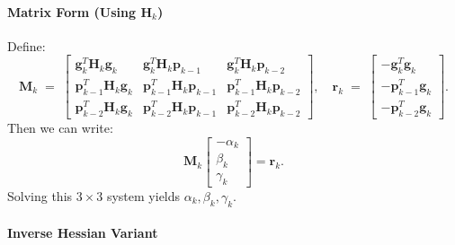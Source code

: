 \documentclass[12pt]{article}
\begin{document}
\paragraph{Matrix Form (Using \(\mathbf{H}_k\))}
Define:
\[
\mathbf{M}_k \;=\;
\begin{bmatrix}
\mathbf{g}_k^T \mathbf{H}_k \mathbf{g}_k & \mathbf{g}_k^T \mathbf{H}_k \mathbf{p}_{k-1} & \mathbf{g}_k^T \mathbf{H}_k \mathbf{p}_{k-2} \\[6pt]
\mathbf{p}_{k-1}^T \mathbf{H}_k \mathbf{g}_k & \mathbf{p}_{k-1}^T \mathbf{H}_k \mathbf{p}_{k-1} & \mathbf{p}_{k-1}^T \mathbf{H}_k \mathbf{p}_{k-2} \\[6pt]
\mathbf{p}_{k-2}^T \mathbf{H}_k \mathbf{g}_k & \mathbf{p}_{k-2}^T \mathbf{H}_k \mathbf{p}_{k-1} & \mathbf{p}_{k-2}^T \mathbf{H}_k \mathbf{p}_{k-2}
\end{bmatrix},
\quad
\mathbf{r}_k \;=\;
\begin{bmatrix}
-\mathbf{g}_k^T \mathbf{g}_k \\[3pt]
-\mathbf{p}_{k-1}^T \mathbf{g}_k \\[3pt]
-\mathbf{p}_{k-2}^T \mathbf{g}_k
\end{bmatrix}.
\]
Then we can write:
\[
\mathbf{M}_k
\begin{bmatrix}
-\alpha_k \\ \beta_k \\ \gamma_k
\end{bmatrix}
=
\mathbf{r}_k.
\]
Solving this \(3 \times 3\) system yields \(\alpha_k, \beta_k, \gamma_k\).

\paragraph{Inverse Hessian Variant}
\end{document}
